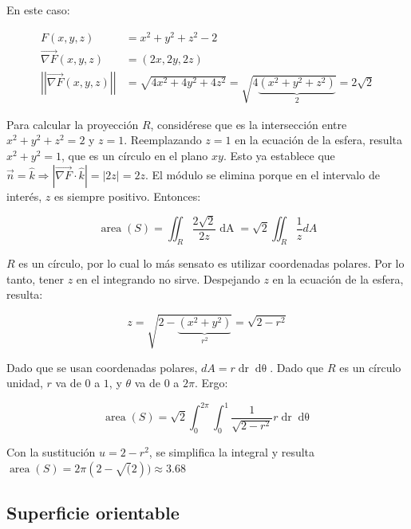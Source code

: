 \documentclass{article}
\begin{document}
En este caso:

\begin{subequations}
\begin{align}
F(x,y,z) &= x^2 + y^2 + z^2 - 2 \\
\overrightarrow{\nabla F}(x,y,z) &= (2x, 2y, 2z) \\
\left|\left|\overrightarrow{\nabla F}(x,y,z)\right|\right| &= \sqrt{4x^2 + 4y^2 + 4z^2} = \sqrt{4 \underbrace{(x^2 + y^2 + z^2)}_{2}} = 2 \sqrt{2}
\end{align}
\end{subequations}

Para calcular la proyección $R$, considérese que es la intersección entre $x^2 + y^2 + z^2 = 2$ y $z = 1$. Reemplazando $z = 1$ en la ecuación de la esfera, resulta $x^2 + y^2 = 1$, que es un círculo en el plano $xy$. Esto ya establece que $\overrightarrow{n} = \hat{k} \Rightarrow | \overrightarrow{ \nabla F } \cdot \hat{k}| = |2z| = 2z$. El módulo se elimina porque en el intervalo de interés, $z$ es siempre positivo. Entonces:

\begin{equation}
\mathop{area}(S) = \iint_R \frac{2 \sqrt{2}}{2z} \mathop{dA} = \sqrt{2} \iint_R \frac{1}{z} dA 
\end{equation}

$R$ es un círculo, por lo cual lo más sensato es utilizar coordenadas polares. Por lo tanto, tener $z$ en el integrando no sirve. Despejando $z$ en la ecuación de la esfera, resulta:

\begin{equation}
z = \sqrt{2 - \underbrace{ (x^2 + y^2) }_{r^2}} = \sqrt{2 - r^2}
\end{equation}

Dado que se usan coordenadas polares, $dA = r \mathop{dr} \mathop{d\theta}$. Dado que $R$ es un círculo unidad, $r$ va de $0$ a $1$, y $\theta$ va de $0$ a $2\pi$. Ergo:

\begin{equation}
\mathop{area}(S) = \sqrt{2} \int_0^{2\pi} \int_0^1 \frac{1}{\sqrt{2 - r^2}} r \mathop{dr} \mathop{d\theta}
\end{equation}

Con la sustitución $u = 2 - r^2$, se simplifica la integral y resulta $\mathop{area}(S) = 2\pi (2 - \sqrt(2)) \approx 3.68$

\subsection{Superficie orientable}
\end{document}
